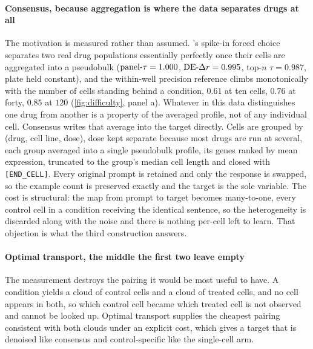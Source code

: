 \paragraph{Consensus, because aggregation is where the data separates drugs at
all} The motivation is measured rather than assumed. 's
spike-in forced choice separates two real drug populations essentially perfectly
once their cells are aggregated into a pseudobulk ($\textrm{panel-}\tau = 1.000$,
$\textrm{DE-}\Delta r = 0.995$, top-$n$ $\tau = 0.987$, plate held constant), and the within-well
precision reference climbs monotonically with the number of cells standing behind
a condition, $0.61$ at ten cells, $0.76$ at forty, $0.85$ at $120$
(\cref{fig:difficulty}, panel a). Whatever in this data distinguishes one drug
from another is a property of the averaged profile, not of any individual cell.
Consensus writes that average into the target directly. Cells are grouped by
(drug, cell line, dose), dose kept separate because most drugs are run at several,
each group averaged into a single pseudobulk profile, its genes ranked by mean
expression, truncated to the group's median cell length and closed with
\texttt{[END\_CELL]}. Every original prompt is retained and only the response is
swapped, so the example count is preserved exactly and the target is the sole
variable. The cost is structural: the map from prompt to target becomes
many-to-one, every control cell in a condition receiving the identical sentence,
so the heterogeneity is discarded along with the noise and there is nothing
per-cell left to learn. That objection is what the third construction answers.

\paragraph{Optimal transport, the middle the first two leave empty} The
measurement destroys the pairing it would be most useful to have. A condition
yields a cloud of control cells and a cloud of treated cells, and no cell appears
in both, so which control cell became which treated cell is not observed and
cannot be looked up. Optimal transport supplies the cheapest pairing consistent
with both clouds under an explicit cost, which gives a target that is denoised
like consensus and control-specific like the single-cell arm.

